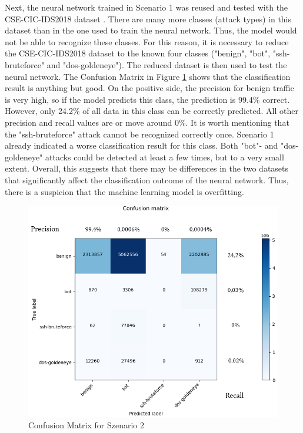 \documentclass[conference]{IEEEtran}
\begin{document}
Next, the neural network trained in Scenario 1 was reused and tested with the CSE-CIC-IDS2018 dataset \cite{max2}. There are many more classes (attack types) in this dataset than in the one used to train the neural network. Thus, the model would not be able to recognize these classes. For this reason, it is necessary to reduce the CSE-CIC-IDS2018 dataset \cite{max2} to the known four classes ("benign", "bot", "ssh-bruteforce" and "dos-goldeneye"). The reduced dataset is then used to test the neural network. The Confusion Matrix in Figure  \ref{fig:cm2} shows that the classification result is anything but good. On the positive side, the precision for benign traffic is very high, so if the model predicts this class, the prediction is 99.4\% correct. However, only 24.2\% of all data in this class can be correctly predicted. All other precision and recall values are or move around 0\%. It is worth mentioning that the "ssh-bruteforce" attack cannot be recognized correctly once. Scenario 1 already indicated a worse classification result for this class. Both "bot"- and "dos-goldeneye" attacks could be detected at least a few times, but to a very small extent. Overall, this suggests that there may be differences in the two datasets that significantly affect the classification outcome of the neural network. Thus, there is a suspicion that the machine learning model is overfitting.

\begin{figure}[htbp]  
\centerline{\includegraphics[scale=0.65]{NeuesModellAlteDaten.png}}
\caption{Confusion Matrix for Szenario 2}
\label{fig:cm2}
\end{figure}
\end{document}
